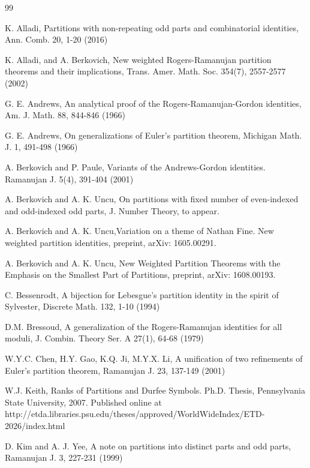 \documentclass{amsart}
\begin{document}
\begin{thebibliography}{99}

 K. Alladi, Partitions with non-repeating odd parts and combinatorial identities, Ann. Comb. 20, 1-20 (2016)

 K. Alladi, and A. Berkovich, New weighted Rogers-Ramanujan partition theorems and their implications, Trans. Amer. Math. Soc. 354(7),  2557-2577 (2002)

 G. E. Andrews, An analytical proof of the Rogers-Ramanujan-Gordon identities, Am. J. Math. 88,  844-846 (1966)    

 G. E. Andrews, On generalizations of Euler's partition theorem, Michigan Math. J. 1, 491-498 (1966)

 A. Berkovich and P. Paule, Variants of the Andrews-Gordon identities. Ramanujan J. 5(4), 391-404 (2001)


 A. Berkovich and A. K. Uncu, On partitions with fixed number of even-indexed and odd-indexed odd parts, J. Number Theory, to appear.


 A. Berkovich and A. K. Uncu,Variation on a theme of Nathan Fine. New weighted partition identities, preprint, arXiv: 1605.00291.


 A. Berkovich and A. K. Uncu, New Weighted Partition Theorems with the Emphasis on the Smallest Part of Partitions, preprint, arXiv: 1608.00193.


 C. Bessenrodt, A bijection for Lebesgue's partition identity in the spirit of Sylvester, Discrete Math.  132, 1-10 (1994)



 D.M. Bressoud, A generalization of the Rogers-Ramanujan identities for all moduli, J. Combin. Theory Ser. A 27(1), 64-68 (1979)

 W.Y.C. Chen, H.Y. Gao, K.Q. Ji, M.Y.X. Li, A unification of two refinements of Euler's partition theorem, Ramanujan J. 23, 137-149 (2001)

 W.J. Keith, Ranks of Partitions and Durfee Symbols. Ph.D. Thesis, Pennsylvania State University, 2007. Published online at http://etda.libraries.psu.edu/theses/approved/WorldWideIndex/ETD-2026/index.html

 D. Kim and A. J. Yee, A note on partitions into distinct parts and odd parts, Ramanujan J. 3, 227-231 (1999)


\end{thebibliography}
\end{document}
